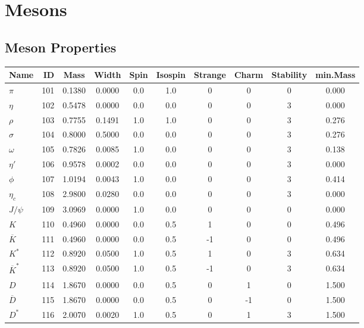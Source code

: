 \documentclass[a4paper,10pt]{article}
\begin{document}
\pagestyle{empty}
\section{Mesons}
\subsection{Meson Properties}
\begin{tabular}{|lr|cccccccc|} 
\hline
\textbf{Name}&\textbf{ID}&\textbf{Mass}&\textbf{Width}&\textbf{Spin}&
\textbf{Isospin}&\textbf{Strange}&\textbf{Charm}&\textbf{Stability}&\textbf{min.Mass} \\
\hline
$\pi           $  & 101 & 0.1380 & 0.0000 &  0.0 &  1.0 &  0 &  0 &  0& 0.000\\
$\eta          $  & 102 & 0.5478 & 0.0000 &  0.0 &  0.0 &  0 &  0 &  3& 0.000\\
$\rho          $  & 103 & 0.7755 & 0.1491 &  1.0 &  1.0 &  0 &  0 &  3& 0.276\\
$\sigma        $  & 104 & 0.8000 & 0.5000 &  0.0 &  0.0 &  0 &  0 &  3& 0.276\\
$\omega        $  & 105 & 0.7826 & 0.0085 &  1.0 &  0.0 &  0 &  0 &  3& 0.138\\
$\eta'         $  & 106 & 0.9578 & 0.0002 &  0.0 &  0.0 &  0 &  0 &  3& 0.000\\
$\phi          $  & 107 & 1.0194 & 0.0043 &  1.0 &  0.0 &  0 &  0 &  3& 0.414\\
$\eta_c        $  & 108 & 2.9800 & 0.0280 &  0.0 &  0.0 &  0 &  0 &  3& 0.000\\
$J/\psi        $  & 109 & 3.0969 & 0.0000 &  1.0 &  0.0 &  0 &  0 &  0& 0.000\\
\hline
$K             $  & 110 & 0.4960 & 0.0000 &  0.0 &  0.5 &  1 &  0 &  0& 0.496\\
$\overline{K}  $  & 111 & 0.4960 & 0.0000 &  0.0 &  0.5 & -1 &  0 &  0& 0.496\\
$K^*           $  & 112 & 0.8920 & 0.0500 &  1.0 &  0.5 &  1 &  0 &  3& 0.634\\
$\overline{K}^*$  & 113 & 0.8920 & 0.0500 &  1.0 &  0.5 & -1 &  0 &  3& 0.634\\
\hline
$D             $  & 114 & 1.8670 & 0.0000 &  0.0 &  0.5 &  0 &  1 &  0& 1.500\\
$\overline{D}  $  & 115 & 1.8670 & 0.0000 &  0.0 &  0.5 &  0 & -1 &  0& 1.500\\
$D^*           $  & 116 & 2.0070 & 0.0020 &  1.0 &  0.5 &  0 &  1 &  3& 1.500\\

\end{tabular}
\end{document}
